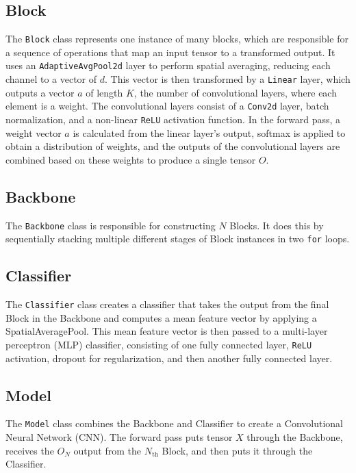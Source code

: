 \documentclass[12pt]{article}
\begin{document}
\subsection{Block}
The \texttt{Block} class represents one instance of many blocks, which are responsible for a sequence of operations that map an input tensor to a transformed output. It uses an \texttt{AdaptiveAvgPool2d} layer to perform spatial averaging, reducing each channel to a vector of \(d\). This vector is then transformed by a \texttt{Linear} layer, which outputs a vector \( a \) of length \( K \), the number of convolutional layers, where each element is a weight. The convolutional layers consist of a \texttt{Conv2d} layer, batch normalization, and a non-linear \texttt{ReLU} activation function. In the forward pass, a weight vector \( a \) is calculated from the linear layer's output, softmax is applied to obtain a distribution of weights, and the outputs of the convolutional layers are combined based on these weights to produce a single tensor \( O \). 

\restoregeometry
\subsection{Backbone}
The \texttt{Backbone} class is responsible for constructing \( N \) Blocks. It does this by sequentially stacking multiple different stages of Block instances in two \texttt{for} loops.  

\subsection{Classifier}
The \texttt{Classifier} class creates a classifier that takes the output from the final Block in the Backbone and computes a mean feature vector by applying a SpatialAveragePool. This mean feature vector is then passed to a multi-layer perceptron (MLP) classifier, consisting of one fully connected layer, \texttt{ReLU} activation, dropout for regularization, and then another fully connected layer.

\subsection{Model}
The \texttt{Model} class combines the Backbone and Classifier to create a Convolutional Neural Network (CNN). The forward pass puts tensor \( X \) through the Backbone, receives the \( O_N \) output from the \( N_{\text{th}} \) Block, and then puts it through the Classifier. 
\end{document}
